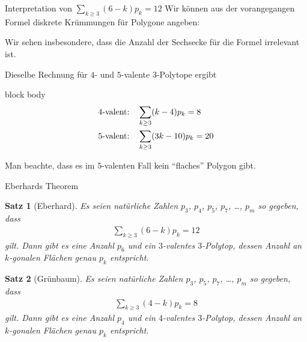 \documentclass[10pt, notheorems]{beamer}
\newtheorem{theorem}{Satz}[section]
\begin{document}
\begin{frame}{Interpretation von $\sum_{k \geq 3} (6 - k) p_k = 12$}
  Wir können aus der vorangegangen Formel diskrete Krümmungen für Polygone angeben:

  \centering
  
  \pause
  \justifying
  Wir sehen insbesondere, dass die Anzahl der Sechsecke für die Formel irrelevant ist.
\end{frame}

\begin{frame}
  Dieselbe Rechnung für $4$- und $5$-valente $3$-Polytope ergibt

  \medskip
  \begin{beamercolorbox}[sep=-10pt,center,shadow=true,rounded=true]{block body}
    \begin{align*}
      4\text{-valent:\quad}&\sum_{k \geq 3} (k-4)p_k = 8\\
      5\text{-valent:\quad}&\sum_{k \geq 3} (3k-10)p_k = 20
    \end{align*}
  \end{beamercolorbox}
  \medskip

  Man beachte, dass es im $5$-valenten Fall kein ``flaches'' Polygon gibt.
\end{frame}

\begin{frame}{{\sc Eberhard}s Theorem}
  \begin{theorem}[\sc Eberhard]
    Es seien natürliche Zahlen $p_3$, $p_4$, $p_5$, $p_7$, \dots, $p_m$ so gegeben, dass
    \begin{align*}
      \sum_{k \geq 3} (6 - k) p_k = 12
    \end{align*}
    gilt. Dann gibt es eine Anzahl $p_6$ und ein $3$-valentes $3$-Polytop, dessen Anzahl an $k$-gonalen Flächen genau $p_k$ entspricht.   
  \end{theorem}
  \pause
  \begin{theorem}[\sc Grünbaum]
    Es seien natürliche Zahlen $p_3$, $p_5$, $p_7$, \dots, $p_m$ so gegeben, dass
    \begin{align*}
      \sum_{k \geq 3} (4 - k) p_k = 8
    \end{align*}
    gilt. Dann gibt es eine Anzahl $p_4$ und ein $4$-valentes $3$-Polytop, dessen Anzahl an $k$-gonalen Flächen genau $p_k$ entspricht.   
  \end{theorem}
\end{frame}
\end{document}
